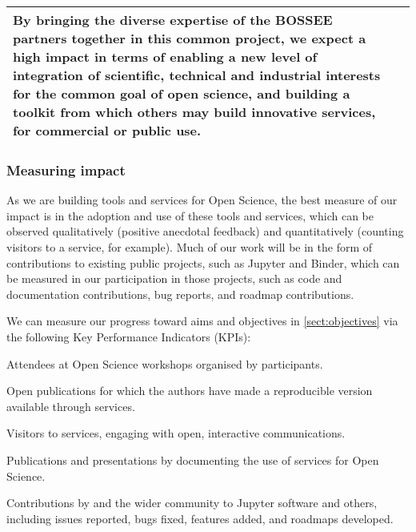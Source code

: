 \begin{center}
\begin{tabular}{|m{}|m{}|}
  By bringing the diverse expertise of the BOSSEE partners together in this
  common project, we expect a high impact in terms of enabling a new level of
  integration of scientific, technical and industrial interests for the common
  goal of open science,
  and building a toolkit from which others may build innovative services,
  for commercial or public use.

  \\\hline

\end{tabular}
\end{center}


\subsubsection{Measuring impact}

As we are building tools and services for Open Science,
the best measure of our impact is in the adoption and use of these tools and services,
which can be observed qualitatively (positive anecdotal feedback) and quantitatively
(counting visitors to a service, for example).
Much of our work will be in the form of contributions to existing public projects,
such as Jupyter and Binder,
which can be measured in our participation in those projects,
such as code and documentation contributions,
bug reports, and roadmap contributions.

We can measure our progress toward aims and objectives in \ref{sect:objectives}
via the following
Key Performance Indicators (KPIs):

\begin{compactenum}
  \item \label{kpi:workshop-attendees}
    Attendees at Open Science workshops organised by \TheProject participants.
  \item \label{kpi:binder-publications}
    Open publications for which the authors have made a reproducible version available through \TheProject services.
  \item \label{kpi:binder-visits}
    Visitors to \TheProject services, engaging with open, interactive communications.
  \item \label{kpi:dissemination}
    Publications and presentations by \TheProject documenting the use of \TheProject services for Open Science.
  \item \label{kpi:contributions}
    Contributions by \TheProject and the wider community to Jupyter software and others,
    including issues reported, bugs fixed,
    features added, and roadmaps developed.
\end{compactenum}

